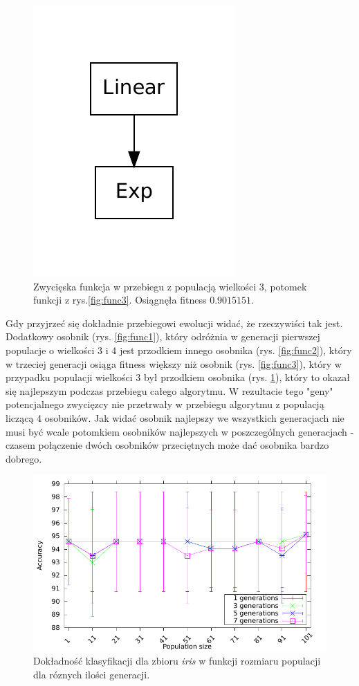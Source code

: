     	\begin{figure}
		\includegraphics[scale=0.60]{figures/functions/func4}
		\caption{Zwycięska funkcja w przebiegu z populacją wielkości 3, potomek funkcji z rys.\ref{fig:func3}. Osiągnęła fitness $0.9015151$. \label{fig:func4}}
	\end{figure} 	
	
	 Gdy przyjrzeć się dokładnie przebiegowi ewolucji widać, że rzeczywiści tak jest. Dodatkowy osobnik (rys. \ref{fig:func1}), który odróżnia w generacji pierwszej populacje o wielkości 3 i 4 jest przodkiem innego osobnika (rys. \ref{fig:func2}), który w trzeciej generacji osiąga fitness większy niż osobnik (rys. \ref{fig:func3}), który w przypadku populacji wielkości 3 był przodkiem osobnika (rys. \ref{fig:func4}), który to okazał się najlepszym podczas przebiegu całego algorytmu. W rezultacie tego "geny" potencjalnego zwycięzcy nie przetrwały w przebiegu algorytmu z populacją liczącą 4 osobników. Jak widać osobnik najlepszy we wszystkich generacjach nie musi być wcale potomkiem osobników najlepszych w poszczególnych generacjach - czasem połączenie dwóch osobników przeciętnych może dać osobnika bardzo dobrego. 	

	\begin{figure}
		\includegraphics[scale=0.90]{figures/accuracy/accuracy-iris}
		\caption{Dokładność klasyfikacji dla zbioru \emph{iris} w funkcji rozmiaru populacji dla róznych ilości generacji.\label{fig:acc-iris}}
	\end{figure}
	
